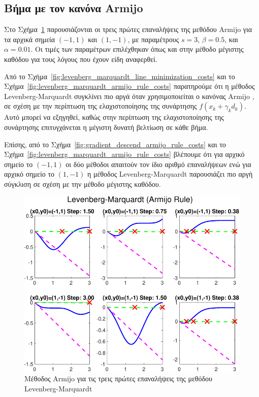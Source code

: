\documentclass[a4paper,12pt]{article}
\begin{document}
\subsection*{Βήμα με τον κανόνα  Armijo}
Στο Σχήμα~\ref{fig:levenberg_marquardt_armijo_rule_iters} παρουσιάζονται οι τρεις πρώτες επαναλήψεις της μεθόδου 
 Armijo  για τα αρχικά σημεία $(-1, 1)$ και $(1, -1)$,
με παραμέτρους $s = 3$, $\beta = 0.5$, και $\alpha = 0.01$. Οι τιμές των παραμέτρων επιλέχθηκαν όπως και στην 
μέθοδο μέγιστης καθόδου για τους λόγους που έχουν είδη αναφερθεί.

Από το Σχήμα~\ref{fig:levenberg_marquardt_line_minimization_costs}
και το Σχήμα~\ref{fig:levenberg_marquardt_armijo_rule_costs} παρατηρούμε ότι η μέθοδος 
 Levenberg-Marquardt  συγκλίνει πιο αργά όταν χρησιμοποιείται ο κανόνας
 Armijo , σε σχέση με την περίπτωση της ελαχιστοποίησης της συνάρτησης 
$f(x_k + \gamma_k d_k)$. Αυτό μπορεί να εξηγηθεί, καθώς στην περίπτωση της ελαχιστοποίησης της συνάρτησης επιτυγχάνεται
η μέγιστη δυνατή βελτίωση σε κάθε βήμα.

Επίσης, από το Σχήμα~\ref{fig:gradient_descend_armijo_rule_costs}
και το Σχήμα~\ref{fig:levenberg_marquardt_armijo_rule_costs} βλέπουμε ότι για αρχικό σημείο το $(-1, 1)$
οι δύο μέθοδοι απαιτούν τον ίδιο αριθμό επαναλήψεων ενώ για αρχικό σημείο το $(1, -1)$ η μέθοδος
Levenberg-Marquardt παρουσιάζει πιο αργή σύγκλιση σε σχέση με την
μέθοδο μέγιστης καθόδου.

\begin{figure}
    \centering
    \includegraphics[width=1\linewidth]{plot/levenberg_marquardt_armijo_rule_iters.pdf}
    \caption{Μέθοδος  Armijo  για τις τρεις πρώτες επαναλήψεις της μεθόδου  Levenberg-Marquardt }
    \label{fig:levenberg_marquardt_armijo_rule_iters}
\end{figure}
\end{document}
